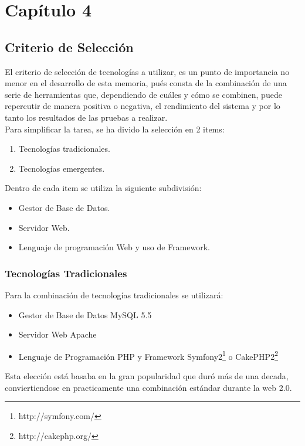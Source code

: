 \chapter{Capítulo 4}

\section{Criterio de Selección}

El criterio de selección de tecnologías a utilizar, es un punto de importancia no menor en 
el desarrollo de esta memoria, pués consta de la combinación de una serie de herramientas que, 
dependiendo de cuáles y cómo se combinen, puede repercutir de manera positiva o negativa, el 
rendimiento del sistema y por lo tanto los resultados de las pruebas a realizar.\\

Para simplificar la tarea, se ha divido la selección en 2 items:
\begin{enumerate}
 \item Tecnologías tradicionales.
 \item Tecnologías emergentes.
\end{enumerate}

Dentro de cada item se utiliza la siguiente subdivisión:
\begin{itemize}
 \item Gestor de Base de Datos.
 \item Servidor Web.
 \item Lenguaje de programación Web y uso de Framework.
\end{itemize}



\subsection{Tecnologías Tradicionales}

Para la combinación de tecnologías tradicionales se utilizará:
\begin{itemize}
 \item Gestor de Base de Datos MySQL 5.5
 \item Servidor Web Apache
 \item Lenguaje de Programación PHP y Framework Symfony2\footnote{http://symfony.com/} o CakePHP2\footnote{http://cakephp.org/}
\end{itemize}

Esta elección está basaba en la gran popularidad que duró más de una decada, conviertiendose 
en practicamente una combinación estándar durante la web 2.0. \\

